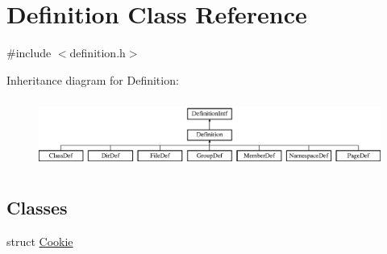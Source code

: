 \hypertarget{class_definition}{}\section{Definition Class Reference}
\label{class_definition}


{\ttfamily \#include $<$definition.\+h$>$}

Inheritance diagram for Definition\+:\begin{figure}[H]
\begin{center}
\leavevmode
\includegraphics[height=2.264151cm]{class_definition}
\end{center}
\end{figure}
\subsection*{Classes}
\begin{DoxyCompactItemize}
\item 
struct \mbox{\hyperlink{struct_definition_1_1_cookie}{Cookie}}
\end{DoxyCompactItemize}
